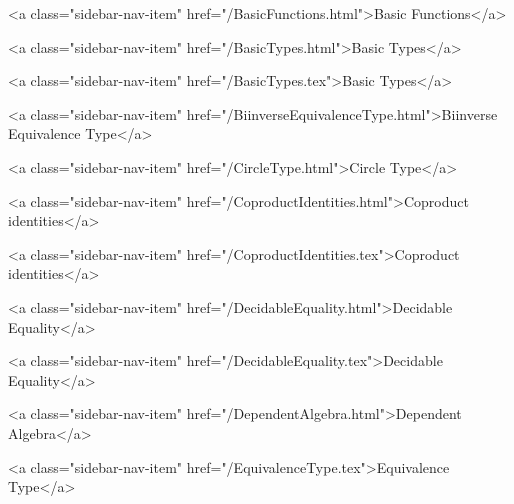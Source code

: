       
    
      
        
          <a class="sidebar-nav-item" href="/BasicFunctions.html">Basic Functions</a>
        
      
    
      
        
          <a class="sidebar-nav-item" href="/BasicTypes.html">Basic Types</a>
        
      
    
      
        
          <a class="sidebar-nav-item" href="/BasicTypes.tex">Basic Types</a>
        
      
    
      
        
          <a class="sidebar-nav-item" href="/BiinverseEquivalenceType.html">Biinverse Equivalence Type</a>
        
      
    
      
        
          <a class="sidebar-nav-item" href="/CircleType.html">Circle Type</a>
        
      
    
      
        
          <a class="sidebar-nav-item" href="/CoproductIdentities.html">Coproduct identities</a>
        
      
    
      
        
          <a class="sidebar-nav-item" href="/CoproductIdentities.tex">Coproduct identities</a>
        
      
    
      
        
          <a class="sidebar-nav-item" href="/DecidableEquality.html">Decidable Equality</a>
        
      
    
      
        
          <a class="sidebar-nav-item" href="/DecidableEquality.tex">Decidable Equality</a>
        
      
    
      
        
          <a class="sidebar-nav-item" href="/DependentAlgebra.html">Dependent Algebra</a>
        
      
    
      
        
          <a class="sidebar-nav-item" href="/EquivalenceType.tex">Equivalence Type</a>
        
